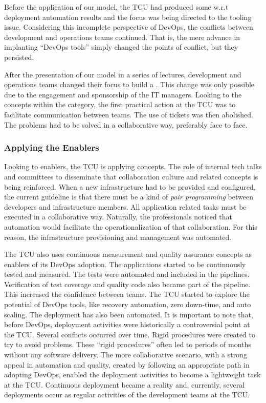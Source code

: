 Before the application of our model, the TCU had produced some w.r.t deployment
automation results and the focus was being directed to the tooling issue. Considering this
incomplete perspective of DevOps, the conflicts between development and operations
teams continued. That is, the mere advance in implanting ``DevOps tools'' simply
changed the points of conflict, but they persisted.

After the presentation of our  model in a series of lectures, development and
operations teams changed their focus to build a \cc. This
change was only possible due to the engagement and sponsorship of the IT
managers. Looking to the concepts within the \cc category, the first practical
action at the TCU was to facilitate communication between teams. The use of tickets
was then abolished. The problems had to be solved in a collaborative way, preferably
face to face.

\subsubsection{Applying the Enablers}

Looking to enablers, the TCU is applying  concepts.
The role of internal tech talks and committees to disseminate that collaboration
culture and related concepts is being reinforced.
When a new infrastructure had to be provided and configured, the current guideline is
that there must be a kind of \emph{pair programming} between developers and infrastructure
members. All application related tasks must be executed in a collaborative
way. Naturally, the professionals noticed that automation would facilitate the
operationalization of that collaboration. For this reason, the infrastructure provisioning
and management was automated.

The TCU also uses continuous measurement and quality assurance concepts as
enablers of its DevOps adoption. The applications started to be continuously
tested and measured. The tests were automated and included in the pipelines.
Verification of test coverage and quality code also became part of the pipeline.
This increased the confidence between teams. The TCU started
to explore the potential of DevOps tools, like recovery automation, zero
down-time, and auto scaling. The deployment has also been automated.
It is important to note that, before DevOps, deployment activities were historically a controversial point at the TCU.
Several conflicts occurred over time. Rigid procedures were created to try to
avoid problems. These ``rigid procedures'' often led to periods of months
without any software delivery. The more collaborative scenario, with a strong appeal in automation and quality,
created by following an appropriate path in adopting DevOps, enabled the deployment activities to become
a lightweight task at the TCU. Continuous deployment became a reality and, currently, several deployments
occur as regular activities of the development teams at the TCU.

